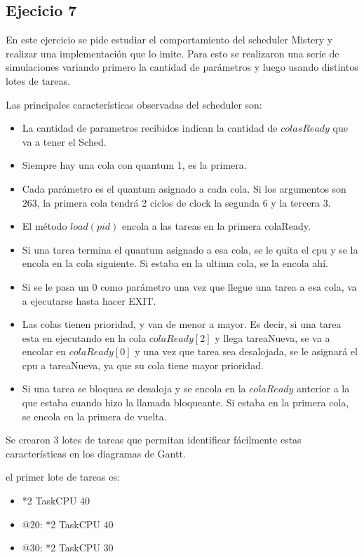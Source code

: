 \subsection{Ejecicio 7}

En este ejercicio se pide estudiar el comportamiento del scheduler Mistery y realizar una implementación que lo imite.
Para esto se realizaron una serie de simulaciones variando primero la cantidad de parámetros y luego usando distintos lotes de tareas.

Las principales características observadas del scheduler son:
\begin{itemize}
\item La cantidad de parametros recibidos indican la cantidad de $colasReady$ que va a tener el Sched.
\item Siempre hay una cola con quantum 1, es la primera.
\item Cada parámetro es el quantum asignado a cada cola. Si los argumentos son $2 6 3$, la primera cola tendrá 2 ciclos de clock
la segunda 6 y la tercera 3.
\item El método $load(pid)$ encola a las tareas en la primera colaReady. 
\item Si una tarea termina el quantum asignado a esa cola, se le quita el cpu y se la encola en la cola siguiente. Si estaba en la ultima cola, se la encola ahí.
\item Si se le pasa un 0 como parámetro una vez que llegue una tarea a esa cola, va a ejecutarse hasta hacer EXIT.
\item Las colas tienen prioridad, y van de menor a mayor. Es decir, si una tarea esta en ejecutando en la cola $colaReady[2]$ y llega tareaNueva, se va a encolar
en $colaReady[0]$ y una vez que tarea sea desalojada, se le asignará el cpu a tareaNueva, ya que su cola tiene mayor prioridad.
\item Si una tarea se bloquea se desaloja y se encola en la $colaReady$ anterior a la que estaba cuando hizo la llamada bloqueante. Si estaba en la primera cola,
se encola en la primera de vuelta.
\end{itemize}


Se crearon 3 lotes de tareas que permitan identificar fácilmente estas características en los diagramas de Gantt.

el primer lote de tareas es:

\begin{itemize}

\item *2 TaskCPU 40
\item @20:
 *2 TaskCPU 40
\item @30:
*2 TaskCPU 30

\end{itemize}

